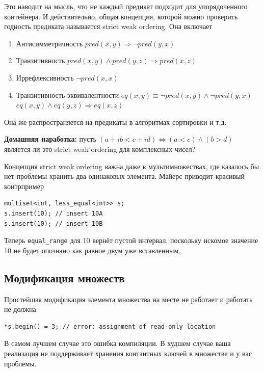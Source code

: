 \documentclass[a4paper,12pt,oneside]{book}
\begin{document}
Это наводит на мысль, что не каждый предикат подходит для упорядоченного контейнера. И действительно, общая концепция, которой можно проверить годность предиката называется strict weak ordering. Она включает

\begin{enumerate}
\item Антисимметричность $pred(x,y) \Rightarrow \neg pred(y,x)$
\item Транзитивность $pred(x,y) \wedge pred(y,z) \Rightarrow pred(x,z)$
\item Иррефлексивность $\neg pred(x,x)$
\item Транзитивность эквивалентности 
$eq(x,y) \equiv \neg pred(x,y) \wedge \neg pred(y,x)$ 
$eq(x,y) \wedge eq(y,z) \Rightarrow eq(x,z)$
\end{enumerate}

Она же распространяется на предикаты в алгоритмах сортировки и т.д.

\textbf{Домашняя наработка:} пусть $(a + ib < c + id) \Leftrightarrow (a < c) \wedge (b > d)$ является ли это strict weak ordering для комплексных чисел?

Концепция strict weak ordering важна даже в мультимножествах, где казалось бы нет проблемы хранить два одинаковых элемента. Майерс \cite{effectivestl} приводит красивый контрпример

\begin{lstlisting}
multiset<int, less_equal<int>> s;
s.insert(10); // insert 10A
s.insert(10); // insert 10B
\end{lstlisting}

Теперь \lstinline!equal_range! для 10 вернёт пустой интервал, поскольку искомое значение 10 не будет опознано как равное двум уже вставленным.

\subsection{Модификация множеств}

Простейшая модификация элемента множества на месте не работает и работать не должна

\begin{lstlisting}
*s.begin() = 3; // error: assignment of read-only location
\end{lstlisting}

В самом лучшем случае это ошибка компиляции. В худшем случае ваша реализация не поддерживает хранения контантных ключей в множестве и у вас проблемы.
\end{document}
